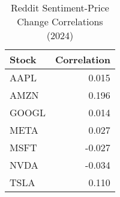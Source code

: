 \begin{table}[h!]
\centering
\caption{Reddit Sentiment-Price Change Correlations (2024)}
\label{tab:reddit_sentiment_price_correlations}
\begin{tabular}{lr}
\hline
Stock & Correlation \\
\hline
AAPL & 0.015 \\
AMZN & 0.196 \\
GOOGL & 0.014 \\
META & 0.027 \\
MSFT & -0.027 \\
NVDA & -0.034 \\
TSLA & 0.110 \\
\hline
\end{tabular}
\end{table}
